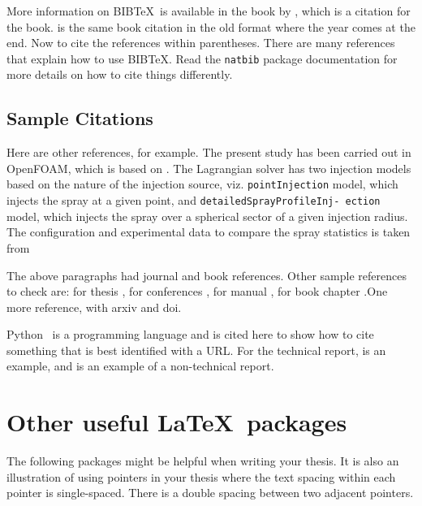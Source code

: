 More information on BIB\TeX\ is available in the book by \cite{lamport:86}, which is a citation for the book. \cite{lamport1:86} is the same book citation in the old format where the year comes at the end. Now to cite the references within parentheses. There are many references~\citep{lamport:86} that explain how to use BIB\TeX.  Read the \verb+natbib+ package documentation for more details on how to cite things differently.

\subsection{Sample Citations}

Here are other references, for example.  The present study has been carried out in OpenFOAM, which is based on \cite{Weller1998}. The Lagrangian solver has two injection models based on the nature of the injection source, viz. \texttt{pointInjection} model, which injects the spray at a given point, and \texttt{detailedSprayProfileInj- ection} model, which injects the spray over a spherical sector of a given injection radius. The configuration and experimental data to compare the spray statistics is taken from \cite{Zhou2015a}

The above paragraphs had journal and book references. Other sample references to check are: for thesis \cite{Syed2013,Cheekati2014,Syed2020}, for conferences \cite{Sasidharan2017,Syed2018,Syed2018a}, for manual \cite{Ayachit2015},  for book chapter \cite{Ahren2005}.One more reference, \cite{Roenby2016} with arxiv and doi.

Python~\citep{py:python} is a programming language and is cited here to show how to cite something that is best identified with a URL. For the technical report, \cite{Syed2015} is an example, and \cite{UnitedNations2019} is an example of a non-technical report.

\section{Other useful \LaTeX\ packages}

The following packages might be helpful when writing your thesis. It is also an illustration of using pointers in your thesis where the text spacing within each pointer is single-spaced. There is a double spacing between two adjacent pointers.

